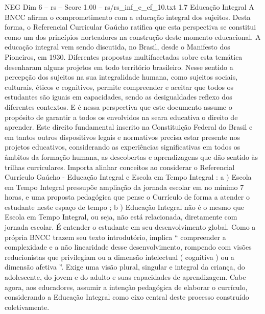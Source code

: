 \begin{textsample}{NEG Dim 6 – rs – Score 1.00 – rs/rs\_inf\_e\_ef\_10.txt}  \label{ex:f6_neg_103}
1.7 Educação Integral A BNCC afirma o comprometimento com a educação integral dos sujeitos.
Desta forma, o Referencial Curricular Gaúcho ratifica que esta perspectiva se constitui como um dos princípios norteadores na construção deste momento educacional.
A educação integral vem sendo discutida, no Brasil, desde o Manifesto dos Pioneiros, em 1930.
Diferentes propostas multifacetadas sobre esta temática desenharam alguns projetos em todo território brasileiro.
Nesse sentido a percepção dos sujeitos na sua integralidade humana, como sujeitos sociais, culturais, éticos e cognitivos, permite compreender e aceitar que todos os estudantes são iguais em capacidades, sendo as desigualdades reflexo dos diferentes contextos.
E é nessa perspectiva que este documento assume o propósito de garantir a todos os envolvidos na seara educativa o direito de aprender.
Este direito fundamental inscrito na Constituição Federal do Brasil e em tantos outros dispositivos legais e normativos precisa estar presente nos projetos educativos, considerando as experiências significativas em todos os âmbitos da formação humana, as descobertas e aprendizagens que dão sentido às trilhas curriculares.
Importa alinhar conceitos ao considerar o Referencial Currículo Gaúcho - Educação Integral e Escola em Tempo Integral : a ) Escola em Tempo Integral pressupõe ampliação da jornada escolar em no mínimo 7 horas, e uma proposta pedagógica que pense o Currículo de forma a atender o estudante neste espaço de tempo ; b ) Educação Integral não é o mesmo que Escola em Tempo Integral, ou seja, não está relacionada, diretamente com jornada escolar.
É entender o estudante em seu desenvolvimento global.
Como a própria BNCC trazem seu texto introdutório, implica “ compreender a complexidade e a não linearidade desse desenvolvimento, rompendo com visões reducionistas que privilegiam ou a dimensão intelectual ( cognitiva ) ou a dimensão afetiva ”.
Exige uma visão plural, singular e integral da criança, do adolescente, do jovem e do adulto e suas capacidades de aprendizagem.
Cabe agora, aos educadores, assumir a intenção pedagógica de elaborar o currículo, considerando a Educação Integral como eixo central deste processo construído coletivamente.

\end{textsample}
